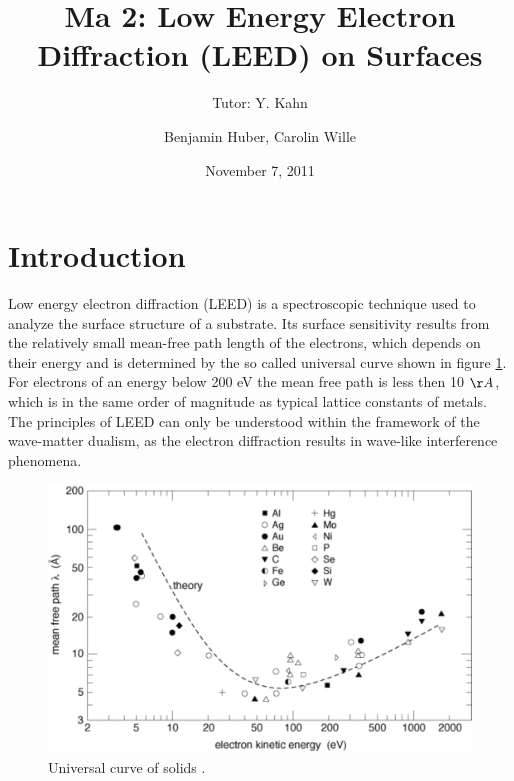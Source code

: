 \documentclass[a4paper]{scrartcl}
\title{Ma 2: Low Energy Electron Diffraction (LEED) on Surfaces}
\subtitle{Tutor: Y. Kahn}
\author{Benjamin Huber, Carolin Wille}
\date{November 7, 2011}
\numberwithin{equation}{section}
\numberwithin{figure}{section}
\numberwithin{table}{section}
\begin{document}
\thispagestyle{empty}
\maketitle
\tableofcontents
\clearpage


\section{Introduction}
Low energy electron diffraction (LEED) is a spectroscopic technique used to analyze the surface structure of a substrate. Its surface sensitivity results from the relatively small mean-free path length of the electrons, which depends on their energy and is determined by the so called universal curve shown in figure \ref{fig:uni}. For electrons of an energy below 200 eV the mean free path is less then 10 $\AA$, which is in the same order of magnitude as typical lattice constants of metals. The principles of LEED can only be understood within the framework of the wave-matter dualism, as the electron diffraction results in wave-like interference phenomena.


\begin{figure}
  \centering
   	\includegraphics[width=\linewidth]{pic/meanfree.pdf}

 \caption{\small Universal curve of solids \cite{zangwill}.  }
        \label{fig:uni}
\end{figure}
\FloatBarrier
\end{document}
